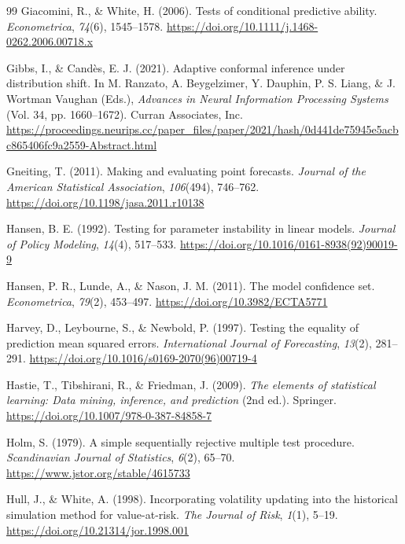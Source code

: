 \documentclass[11pt,a4paper]{article}
\begin{document}
\begin{thebibliography}{99}
 Giacomini, R., \& White, H. (2006). Tests of conditional predictive ability. \emph{Econometrica}, \emph{74}(6), 1545--1578. \url{https://doi.org/10.1111/j.1468-0262.2006.00718.x}

 Gibbs, I., \& Candès, E. J. (2021). Adaptive conformal inference under distribution shift. In M. Ranzato, A. Beygelzimer, Y. Dauphin, P. S. Liang, \& J. Wortman Vaughan (Eds.), \emph{Advances in Neural Information Processing Systems} (Vol. 34, pp. 1660--1672). Curran Associates, Inc. \url{https://proceedings.neurips.cc/paper_files/paper/2021/hash/0d441de75945e5acbc865406fc9a2559-Abstract.html}

 Gneiting, T. (2011). Making and evaluating point forecasts. \emph{Journal of the American Statistical Association}, \emph{106}(494), 746--762. \url{https://doi.org/10.1198/jasa.2011.r10138}

 Hansen, B. E. (1992). Testing for parameter instability in linear models. \emph{Journal of Policy Modeling}, \emph{14}(4), 517--533. \url{https://doi.org/10.1016/0161-8938(92)90019-9}

 Hansen, P. R., Lunde, A., \& Nason, J. M. (2011). The model confidence set. \emph{Econometrica}, \emph{79}(2), 453--497. \url{https://doi.org/10.3982/ECTA5771}


\raggedright

 Harvey, D., Leybourne, S., \& Newbold, P. (1997). Testing the equality of prediction mean squared errors. \emph{International Journal of Forecasting}, \emph{13}(2), 281--291. \url{https://doi.org/10.1016/s0169-2070(96)00719-4}

 Hastie, T., Tibshirani, R., \& Friedman, J. (2009). \emph{The elements of statistical learning: Data mining, inference, and prediction} (2nd ed.). Springer. \url{https://doi.org/10.1007/978-0-387-84858-7}

 Holm, S. (1979). A simple sequentially rejective multiple test procedure. \emph{Scandinavian Journal of Statistics}, \emph{6}(2), 65--70. \url{https://www.jstor.org/stable/4615733}

 Hull, J., \& White, A. (1998). Incorporating volatility updating into the historical simulation method for value-at-risk. \emph{The Journal of Risk}, \emph{1}(1), 5--19. \url{https://doi.org/10.21314/jor.1998.001}


\end{thebibliography}
\end{document}
